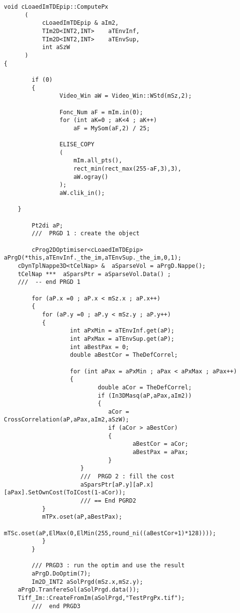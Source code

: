 \begin{lstlisting}
void cLoaedImTDEpip::ComputePx
      (
           cLoaedImTDEpip & aIm2,
           TIm2D<INT2,INT>    aTEnvInf,
           TIm2D<INT2,INT>    aTEnvSup,
           int aSzW
      )
{

        if (0)
        {
                Video_Win aW = Video_Win::WStd(mSz,2);

                Fonc_Num aF = mIm.in(0);
                for (int aK=0 ; aK<4 ; aK++)
                    aF = MySom(aF,2) / 25;

                ELISE_COPY
                (
                    mIm.all_pts(),
                    rect_min(rect_max(255-aF,3),3),
                    aW.ogray()
                );
                aW.clik_in();

    }

        Pt2di aP;
        ///  PRGD 1 : create the object

        cProg2DOptimiser<cLoaedImTDEpip> aPrgD(*this,aTEnvInf._the_im,aTEnvSup._the_im,0,1);
    cDynTplNappe3D<tCelNap> &  aSparseVol = aPrgD.Nappe();
    tCelNap ***  aSparsPtr = aSparseVol.Data() ;
    ///  -- end PRGD 1

        for (aP.x =0 ; aP.x < mSz.x ; aP.x++)
        {
           for (aP.y =0 ; aP.y < mSz.y ; aP.y++)
           {
                   int aPxMin = aTEnvInf.get(aP);
                   int aPxMax = aTEnvSup.get(aP);
                   int aBestPax = 0;
                   double aBestCor = TheDefCorrel;

                   for (int aPax = aPxMin ; aPax < aPxMax ; aPax++)
                   {
                           double aCor = TheDefCorrel;
                           if (In3DMasq(aP,aPax,aIm2))
                           {
                              aCor = CrossCorrelation(aP,aPax,aIm2,aSzW);
                              if (aCor > aBestCor)
                              {
                                     aBestCor = aCor;
                                     aBestPax = aPax;
                              }
                      }
                      ///  PRGD 2 : fill the cost 
                      aSparsPtr[aP.y][aP.x][aPax].SetOwnCost(ToICost(1-aCor));
                      /// == End PGRD2
           }
           mTPx.oset(aP,aBestPax);
           mTSc.oset(aP,ElMax(0,ElMin(255,round_ni((aBestCor+1)*128))));
           }
        }

        /// PRGD3 : run the optim and use the result
        aPrgD.DoOptim(7);
        Im2D_INT2 aSolPrgd(mSz.x,mSz.y);
    aPrgD.TranfereSol(aSolPrgd.data());
    Tiff_Im::CreateFromIm(aSolPrgd,"TestPrgPx.tif");
        ///  end PRGD3




\end{lstlisting}
